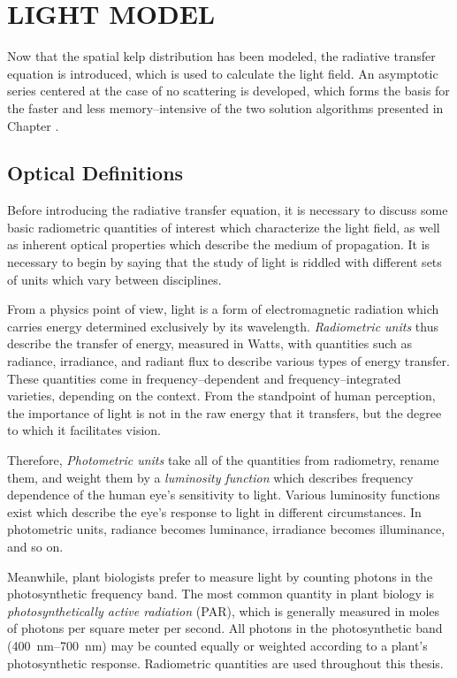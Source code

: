 \chapter{LIGHT MODEL}
\label{chap:light}

Now that the spatial kelp distribution has been modeled, the radiative transfer equation is introduced, which is used to calculate the light field.
An asymptotic series centered at the case of no scattering is developed, which forms the basis for the faster and less memory--intensive of the two solution algorithms presented in Chapter \Rom{\ref{chap:numerical}}.

\section{Optical Definitions}
Before introducing the radiative transfer equation, it is necessary to discuss some basic radiometric quantities of interest which characterize the light field, as well as inherent optical properties which describe the medium of propagation.
It is necessary to begin by saying that the study of light is riddled with different sets of units which vary between disciplines.

From a physics point of view, light is a form of electromagnetic radiation which carries energy determined exclusively by its wavelength.
\textit{Radiometric units} thus describe the transfer of energy, measured in Watts, with quantities such as radiance, irradiance, and radiant flux to describe various types of energy transfer.
These quantities come in frequency--dependent and frequency--integrated varieties, depending on the context.
From the standpoint of human perception, the importance of light is not in the raw energy that it transfers, but the degree to which it facilitates vision.

Therefore, \textit{Photometric units} take all of the quantities from radiometry, rename them, and weight them by a \textit{luminosity function} which describes frequency dependence of the human eye's sensitivity to light.
Various luminosity functions exist which describe the eye's response to light in different circumstances.
In photometric units, radiance becomes luminance, irradiance becomes illuminance, and so on.

Meanwhile, plant biologists prefer to measure light by counting photons in the photosynthetic frequency band.
The most common quantity in plant biology is \textit{photosynthetically active radiation} (PAR), which is generally measured in moles of photons per square meter per second.
All photons in the photosynthetic band (\SI{400}{\nm}--\SI{700}{\nm}) may be counted equally or weighted according to a plant's photosynthetic response.
Radiometric quantities are used throughout this thesis.

